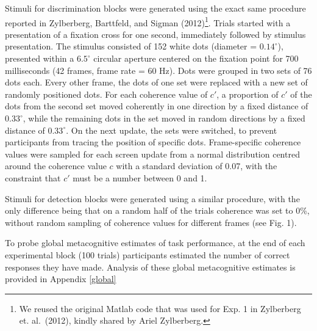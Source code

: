 \documentclass[
  english,
  man]{apa6}
\begin{document}
Stimuli for discrimination blocks were generated using the exact same procedure reported in Zylberberg, Barttfeld, and Sigman (2012)\footnote{We reused the original Matlab code that was used for Exp. 1 in Zylberberg et. al.~(2012), kindly shared by Ariel Zylberberg.}. Trials started with a presentation of a fixation cross for one second, immediately followed by stimulus presentation. The stimulus consisted of 152 white dots (diameter = \(0.14^\circ\)), presented within a \(6.5^\circ\) circular aperture centered on the fixation point for 700 milliseconds (42 frames, frame rate = 60 Hz). Dots were grouped in two sets of 76 dots each. Every other frame, the dots of one set were replaced with a new set of randomly positioned dots. For each coherence value of \(c'\), a proportion of \(c'\) of the dots from the second set moved coherently in one direction by a fixed distance of \(0.33^\circ\), while the remaining dots in the set moved in random directions by a fixed distance of \(0.33^\circ\). On the next update, the sets were switched, to prevent participants from tracing the position of specific dots. Frame-specific coherence values were sampled for each screen update from a normal distribution centred around the coherence value \(c\) with a standard deviation of 0.07, with the constraint that \(c'\) must be a number between 0 and 1.

Stimuli for detection blocks were generated using a similar procedure, with the only difference being that on a random half of the trials coherence was set to 0\%, without random sampling of coherence values for different frames (see Fig. 1).

To probe global metacognitive estimates of task performance, at the end of each experimental block (100 trials) participants estimated the number of correct responses they have made. Analysis of these global metacognitive estimates is provided in Appendix \ref{global}
\end{document}
